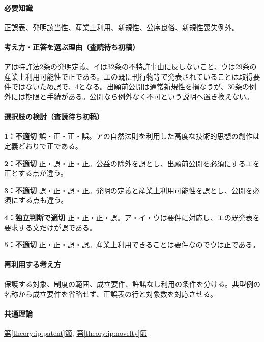 \paragraph{必要知識} 正誤表、発明該当性、産業上利用、新規性、公序良俗、新規性喪失例外。

\paragraph{考え方・正答を選ぶ理由（査読待ち初稿）} アは特許法2条の発明定義、イは32条の不特許事由に反しないこと、ウは29条の産業上利用可能性で正である。エの既に刊行物等で発表されていることは取得要件ではないため誤で、4となる。出願前公開は通常新規性を損なうが、30条の例外には期限と手続がある。公開なら例外なく不可という説明へ置き換えない。

\paragraph{選択肢の検討（査読待ち初稿）}\mbox{}\par

\noindent\textbf{1：不適切} 誤・正・正・誤。アの自然法則を利用した高度な技術的思想の創作は定義どおりで正である。\par

\noindent\textbf{2：不適切} 正・誤・正・正。公益の除外を誤とし、出願前公開を必須にするエを正とする点が違う。\par

\noindent\textbf{3：不適切} 誤・正・誤・正。発明の定義と産業上利用可能性を誤とし、公開を必須にする点も違う。\par

\noindent\textbf{4：独立判断で適切} 正・正・正・誤。ア・イ・ウは要件に対応し、エの既発表を要求する文だけが誤である。\par

\noindent\textbf{5：不適切} 正・正・誤・誤。産業上利用できることは要件なのでウは正である。\par

\paragraph{再利用する考え方} 保護する対象、制度の範囲、成立要件、許諾なし利用の条件を分ける。典型例の名称から成立要件を省略せず、正誤表の行と対象数を対応させる。

\paragraph{共通理論} \hyperref[theory:ip:patent]{第\ref*{theory:ip:patent}節}, \hyperref[theory:ip:novelty]{第\ref*{theory:ip:novelty}節}

